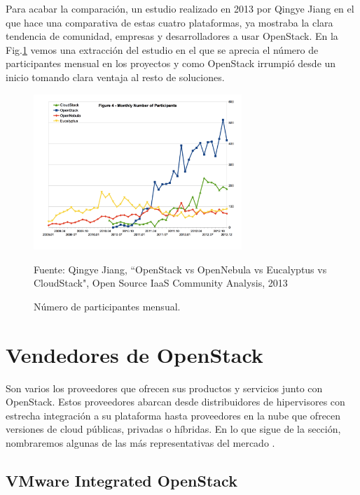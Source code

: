 Para acabar la comparación, un estudio realizado en 2013 por Qingye Jiang \cite{qingye_jiang_cy12-q4_2013} en el que hace una comparativa de estas cuatro plataformas, ya mostraba la clara tendencia de comunidad, empresas y desarrolladores a usar OpenStack. En la Fig.\ref{comparativa del chino} vemos una extracción del estudio en el que se aprecia el número de participantes mensual en los proyectos y como OpenStack irrumpió desde un inicio tomando clara ventaja al resto de soluciones.

\begin{figure}
    \centering
    \includegraphics[width=0.7\textwidth]{imagenes/capitulo2/mesOpenStack.png}
    \caption{Número de participantes mensual.}
	\vspace{0.3cm}
    \footnotesize{Fuente: Qingye Jiang, “OpenStack vs OpenNebula vs Eucalyptus vs CloudStack", Open Source IaaS Community Analysis, 2013}
    \label{comparativa del chino}
\end{figure}


\section{Vendedores de OpenStack}
Son varios los proveedores que ofrecen sus productos y servicios junto con OpenStack. Estos proveedores abarcan desde distribuidores de hipervisores con estrecha integración a su plataforma hasta proveedores en la nube que ofrecen versiones de cloud públicas, privadas o híbridas. En lo que sigue de la sección, nombraremos algunas de las más representativas del mercado \cite{shrivastwa_vendor_2016}.

\subsection{VMware Integrated OpenStack}

